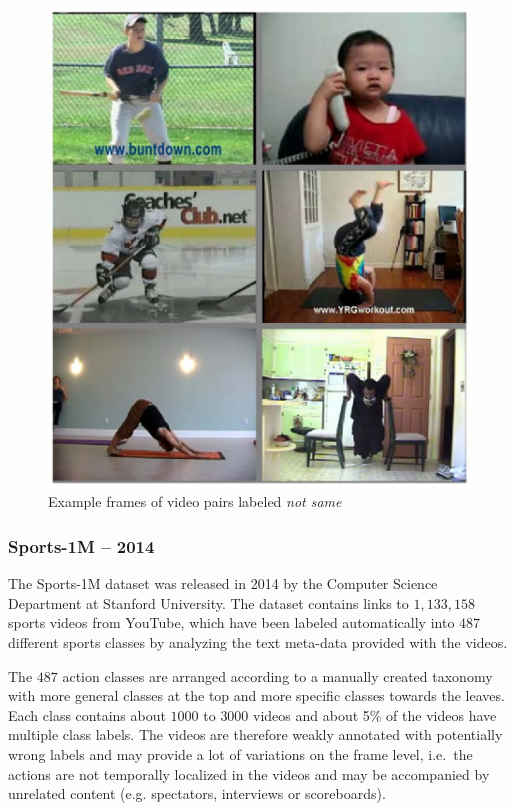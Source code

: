 \begin{minipage}[t]{0.4\textwidth}
    \begin{figure}[H]
        \centering
        \includegraphics[width=\textwidth]{img_datasets/aslan_different}
        \caption{Example frames of video pairs labeled \textit{not same} \cite{kliper-gross_action_2012}}
        \label{fig:aslan_different}
    \end{figure}
\end{minipage}


\subsubsection{Sports-1M -- 2014}
The Sports-1M dataset \cite{karpathy_large-scale_2014} was released in 2014 by the Computer Science Department at Stanford University.
The dataset contains links to $1,133,158$ sports videos from YouTube, which have been labeled automatically into $487$ different sports classes by analyzing the text meta-data provided with the videos.

The $487$ action classes are arranged according to a manually created taxonomy with more general classes at the top and more specific classes towards the leaves.
Each class contains about $1000$ to $3000$ videos and about 5\% of the videos have multiple class labels.
The videos are therefore weakly annotated with potentially wrong labels and may provide a lot of variations on the frame level, i.e.\ the actions are not temporally localized in the videos and may be accompanied by unrelated content (e.g. spectators, interviews or scoreboards).

